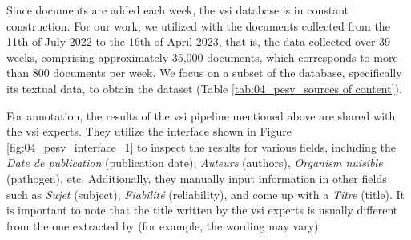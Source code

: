 Since documents are added each week, the \gls{vsi} database is in constant construction. 
For our work, we utilized with the documents collected from the 11th of July 2022 to the 16th of April 2023, that is, the data collected over 39 weeks, comprising approximately 35,000 documents, which corresponds to more than 800 documents per week. We focus on a subset of the \VSI{} database, specifically its textual data, to obtain the \VSI{} dataset  (Table \ref{tab:04_pesv_sources of content}).





\label{vsi_data_annotation}







For annotation, the results of the \gls{vsi} pipeline mentioned above are shared with the \gls{vsi} experts. They utilize the interface shown in Figure \ref{fig:04_pesv_interface_1} to inspect the results for various fields, including the \emph{Date de publication} (publication date), \emph{Auteurs} (authors), \emph{Organism nuisible} (pathogen), etc. Additionally, they manually input information in other fields such as \emph{Sujet} (subject), \emph{Fiabilité} (reliability), and come up with a \emph{Titre} (title).
It is important to note that the title written by the \gls{vsi} experts is usually different from the one extracted by \trafilatura{} (for example, 
the wording may vary). 

